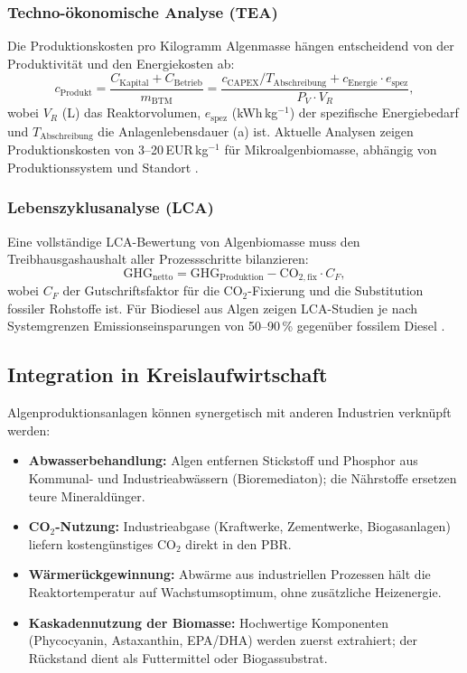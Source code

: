 ﻿\documentclass[a4paper,12pt]{article}
\theoremstyle{definition}
\begin{document}
\subsubsection{Techno-ökonomische Analyse (TEA)}

Die Produktionskosten pro Kilogramm Algenmasse hängen entscheidend von der
Produktivität und den Energiekosten ab:
\[
	c_\mathrm{Produkt}
	= \frac{C_\mathrm{Kapital} + C_\mathrm{Betrieb}}{m_\mathrm{BTM}}
	= \frac{c_\mathrm{CAPEX}/T_\mathrm{Abschreibung} + c_\mathrm{Energie} \cdot e_\mathrm{spez}}{P_V \cdot V_R},
\]
wobei $V_R$ (L) das Reaktorvolumen, $e_\mathrm{spez}$ (kWh\,kg$^{-1}$) der spezifische
Energiebedarf und $T_\mathrm{Abschreibung}$ die Anlagenlebensdauer (a) ist.
Aktuelle Analysen zeigen Produktionskosten von 3--20\,EUR\,kg$^{-1}$ für
Mikroalgenbiomasse, abhängig von Produktionssystem und Standort \cite{chisti2007}.

\subsubsection{Lebenszyklusanalyse (LCA)}

Eine vollständige LCA-Bewertung von Algenbiomasse muss den Treibhausgashaushalt
aller Prozessschritte bilanzieren:
\[
	\mathrm{GHG}_\mathrm{netto} = \mathrm{GHG}_\mathrm{Produktion}
	- \mathrm{CO}_{2,\mathrm{fix}} \cdot C_F,
\]
wobei $C_F$ der Gutschriftsfaktor für die CO$_2$-Fixierung und die Substitution
fossiler Rohstoffe ist. Für Biodiesel aus Algen zeigen LCA-Studien je nach
Systemgrenzen Emissionseinsparungen von 50--90\,\% gegenüber fossilem Diesel
\cite{clarens2010}.

\subsection{Integration in Kreislaufwirtschaft}

Algenproduktionsanlagen können synergetisch mit anderen Industrien verknüpft werden:

\begin{itemize}
	\item \textbf{Abwasserbehandlung:} Algen entfernen Stickstoff und Phosphor
	      aus Kommunal- und Industrieabwässern (Bioremediaton); die Nährstoffe
	      ersetzen teure Mineraldünger.
	\item \textbf{CO$_2$-Nutzung:} Industrieabgase (Kraftwerke, Zementwerke,
	      Biogasanlagen) liefern kostengünstiges CO$_2$ direkt in den PBR.
	\item \textbf{Wärmerückgewinnung:} Abwärme aus industriellen Prozessen
	      hält die Reaktortemperatur auf Wachstumsoptimum, ohne zusätzliche
	      Heizenergie.
	\item \textbf{Kaskadennutzung der Biomasse:} Hochwertige Komponenten
	      (Phycocyanin, Astaxanthin, EPA/DHA) werden zuerst extrahiert;
	      der Rückstand dient als Futtermittel oder Biogassubstrat.
\end{itemize}
\end{document}
